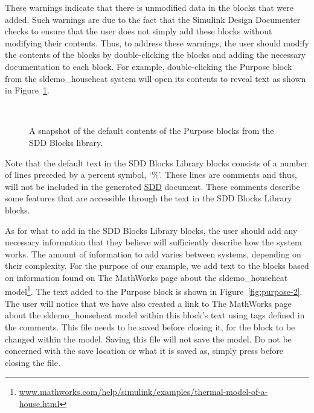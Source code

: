 \documentclass{mcscert}
\newcommand{\mathworks}{The MathWorks}
\newcommand{\sddtool}{Simulink Design Documenter}
\newcommand{\sddblks}{SDD Blocks Library}
\begin{document}
These warnings indicate that there is unmodified data in the blocks that were added. 
Such warnings are due to the fact that the \sddtool{} checks to ensure
that the user does not simply add these blocks without modifying their contents. 
Thus, to address these warnings, the user should modify the contents of the blocks by double-clicking the blocks and adding the necessary documentation to each block. 
For example, double-clicking the Purpose block from the sldemo\_househeat system will open its contents to reveal text as shown in Figure~\ref{fig:purpose-1}.

\begin{figure}
	\caption{A snapshot of the default contents of the Purpose blocks from the SDD Blocks library.}
	\centering
	\label{fig:purpose-1}
	\\
\end{figure}

Note that the default text in the \sddblks{} blocks consists of a number of lines preceded by a percent symbol, `\%'. 
These lines are comments and thus, will not be included in the generated \hyperref[acr:sdd]{SDD} document. 
These comments describe some features that are accessible through the text in
the \sddblks{} blocks.

As for what to add in the \sddblks{} blocks, the user should add any necessary information that they believe will sufficiently describe how the system works. 
The amount of information to add varies between systems, depending on their complexity. 
For the purpose of our example, we add text to the blocks based on information found on \mathworks{} page about the sldemo\_househeat model\footnote{\href{http://www.mathworks.com/help/simulink/examples/thermal-model-of-a-house.html}{www.mathworks.com/help/simulink/examples/thermal-model-of-a-house.html}}. 
The text added to the Purpose block is shown in Figure~\ref{fig:purpose-2}. 
The user will notice that we have also created a link to \mathworks{} page about the sldemo\_househeat model within this block's text using tags defined in the comments. 
This file needs to be saved before closing it, for the block to be changed within the model. 
Saving this file will not save the model. 
Do not be concerned with the save location or what it is saved as, simply press  before closing the file.
\end{document}
